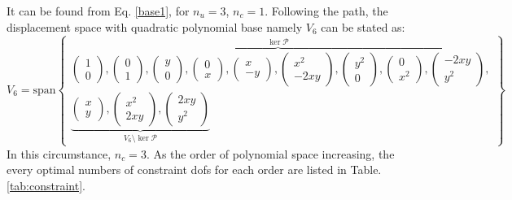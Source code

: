 It can be found from Eq. \eqref{base1}, for $n_u = 3$, $n_c = 1$. Following the path, the displacement space with quadratic polynomial base namely $V_6$ can be stated as:
\begin{equation}\label{base2}
V_6 = \mathrm{span}
\begin{Bmatrix}
\overbrace{
\begin{pmatrix} 1 \\ 0 \end{pmatrix},
\begin{pmatrix} 0 \\ 1 \end{pmatrix},
\begin{pmatrix} y \\ 0 \end{pmatrix},
\begin{pmatrix} 0 \\ x \end{pmatrix},
\begin{pmatrix} x \\ -y \end{pmatrix},
\begin{pmatrix} x^2 \\ -2xy \end{pmatrix},
\begin{pmatrix} y^2 \\ 0 \end{pmatrix},
\begin{pmatrix} 0 \\ x^2 \end{pmatrix},
\begin{pmatrix} -2xy \\ y^2 \end{pmatrix}
}^{\ker \mathcal P}, \\
\underbrace{
\begin{pmatrix} x \\ y \end{pmatrix},
\begin{pmatrix} x^2 \\ 2xy \end{pmatrix},
\begin{pmatrix} 2xy \\ y^2 \end{pmatrix}
}_{V_6\setminus \ker \mathcal P}
\end{Bmatrix}
\end{equation}
In this circumstance, $n_c = 3$. As the order of polynomial space increasing, the every optimal numbers of constraint dofs for each order are listed in Table. \ref{tab:constraint}. 

